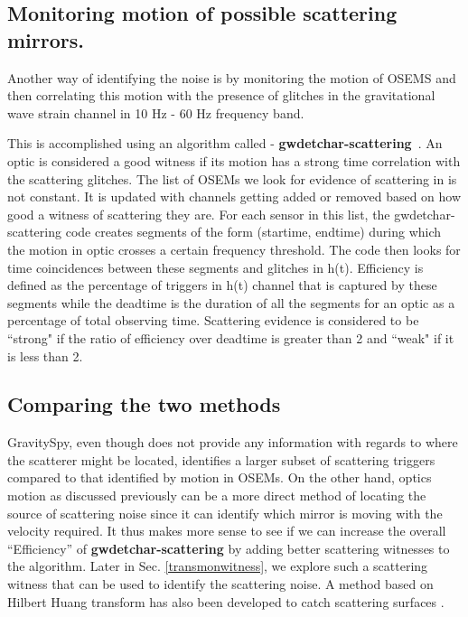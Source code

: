 \documentclass[12pt]{iopart}
\begin{document}
\subsection{Monitoring motion of possible scattering mirrors.}\label{osems}
Another way of identifying the noise is by monitoring the motion of OSEMS and then correlating this motion with the presence of glitches in the gravitational wave strain channel in 10 Hz - 60 Hz frequency band.

This is accomplished using an algorithm called - \textbf{gwdetchar-scattering}~\cite{alex_l_urban_2019_3526829}. An optic is considered a good witness if its motion has a strong time correlation with the scattering glitches. The list of OSEMs we look for evidence of scattering in is not constant. It is updated with channels getting added or removed based on how good a witness of scattering they are. For each sensor in this list, the gwdetchar-scattering code creates segments of the form (startime, endtime) during which the motion in optic crosses a certain frequency threshold.  The code then looks for time coincidences between these segments and glitches in h(t). Efficiency is defined as the percentage of triggers in h(t) channel that is captured by these segments while the deadtime is the duration of all the segments for an optic as a percentage of total observing time. Scattering evidence is considered to be ``strong" if the ratio of efficiency over deadtime is greater than 2 and ``weak" if it is less than 2. 

\subsection{Comparing the two methods}
GravitySpy, even though does not provide any information with regards to where the scatterer might be located, identifies a larger subset of scattering triggers compared to that identified by motion in OSEMs. On the other hand, optics motion as discussed previously can be a more direct method of locating the source of scattering noise since it can identify which mirror is moving with the velocity required. It thus makes more sense to see if we can increase the overall ``Efficiency'' of \textbf{gwdetchar-scattering} by adding better scattering witnesses to the algorithm. Later in Sec. \ref{transmonwitness}, we explore such a scattering witness that can be used to identify the scattering noise. A method based on Hilbert Huang transform has also been developed to catch scattering surfaces \cite{hhtransform}. 
\par
\end{document}
